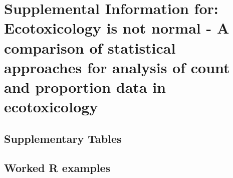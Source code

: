 \chapter[Supplemental Information for: Ecotoxicology is not normal]{Supplemental Information for: Ecotoxicology is not normal - A comparison of statistical approaches for analysis of count and proportion data in ecotoxicology}
\label{ap:usetheglm}  

\section{Supplementary Tables}












\FloatBarrier

\section{Worked R examples}

